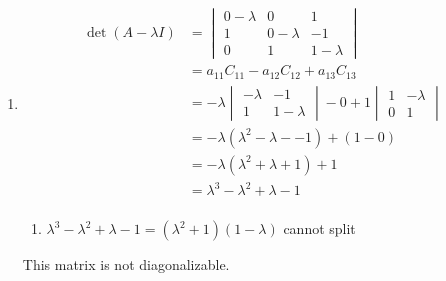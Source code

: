\documentclass[13pt]{article}
\begin{document}
\begin{enumerate}[label=(\alph*),leftmargin=*]
\item
  \begin{align*}
    \det(A - \lambda I) &=
                          \begin{vmatrix}
                            0 - \lambda & 0 & 1 \\
                            1 & 0 - \lambda & -1 \\
                            0 & 1 & 1 - \lambda
                          \end{vmatrix} \\
                        &= a_{11}C_{11} - a_{12}C_{12} + a_{13}C_{13} \\
                        &= -\lambda
                          \begin{vmatrix}
                            -\lambda & -1 \\
                            1 & 1 - \lambda
                          \end{vmatrix} - 0 + 1
                          \begin{vmatrix}
                            1 & -\lambda \\
                            0 & 1
                          \end{vmatrix} \\
                        &= -\lambda(\lambda^2 -\lambda - -1) + (1 - 0) \\
                        &= -\lambda(\lambda^2 + \lambda + 1) + 1 \\
                        &= \lambda^3 - \lambda^2 + \lambda - 1 \\
  \end{align*}

  \begin{enumerate}
  \item $\lambda^3 - \lambda^2 + \lambda - 1 = (\lambda^2 + 1)(1 - \lambda)$ cannot split
  \end{enumerate}
  This matrix is not diagonalizable.


\end{enumerate}
\end{document}

